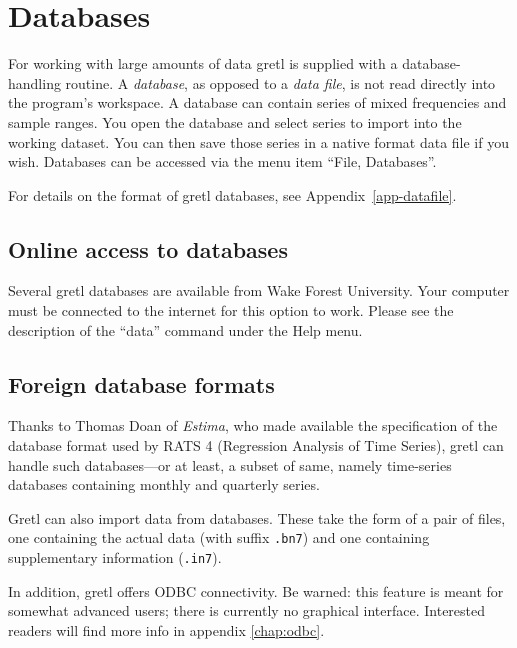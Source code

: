 \section{Databases}
\label{dbase}

For working with large amounts of data gretl is supplied with a
database-handling routine.  A \emph{database}, as opposed to a
\emph{data file}, is not read directly into the program's workspace.
A database can contain series of mixed frequencies and sample ranges.
You open the database and select series to import into the working
dataset.  You can then save those series in a native format data file
if you wish. Databases can be accessed via the menu item ``File,
Databases''.

For details on the format of gretl databases, see
Appendix~\ref{app-datafile}.

\subsection{Online access to databases}
\label{online-data}

Several gretl databases are available from Wake Forest University.
Your computer must be connected to the internet for this option to
work.  Please see the description of the ``data'' command under
the Help menu.



\subsection{Foreign database formats}
\label{RATS}

Thanks to Thomas Doan of \emph{Estima}, who made available the
specification of the database format used by RATS 4 (Regression
Analysis of Time Series), gretl can handle such databases---or at
least, a subset of same, namely time-series databases containing
monthly and quarterly series.

Gretl can also import data from  databases.  These
take the form of a pair of files, one containing the actual data (with
suffix \texttt{.bn7}) and one containing supplementary information
(\texttt{.in7}).  

In addition, gretl offers ODBC connectivity. Be warned: this feature
is meant for somewhat advanced users; there is currently no graphical
interface.  Interested readers will find more info in appendix
\ref{chap:odbc}.

